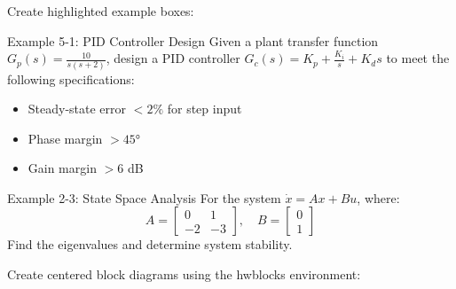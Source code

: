 \documentclass{homework}
\begin{document}

Create highlighted example boxes:

\begin{example}{Example 5-1: PID Controller Design}
Given a plant transfer function $G_p(s) = \frac{10}{s(s+2)}$, design a PID controller 
$G_c(s) = K_p + \frac{K_i}{s} + K_d s$ to meet the following specifications:
\begin{itemize}
\item Steady-state error $< 2\%$ for step input
\item Phase margin $> 45°$
\item Gain margin $> 6$ dB
\end{itemize}
\end{example}

\begin{example}{Example 2-3: State Space Analysis}
For the system $\dot{x} = Ax + Bu$, where:
$$A = \begin{bmatrix} 0 & 1 \\ -2 & -3 \end{bmatrix}, \quad B = \begin{bmatrix} 0 \\ 1 \end{bmatrix}$$
Find the eigenvalues and determine system stability.
\end{example}


Create centered block diagrams using the hwblocks environment:

\begin{hwblocks}
\end{hwblocks}
\end{document}
